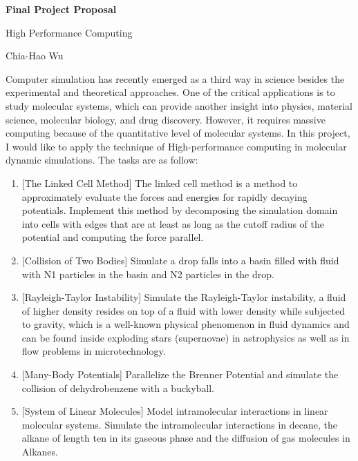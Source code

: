 \documentclass[12pt]{article} %
\newcommand{\question}[2][]{\begin{flushleft}
        \textbf{Question #1}: \textit{#2}

\end{flushleft}}
\newcommand{\maketitletwo}[2][]{\begin{center}
        \Large{\textbf{#1}
        
        High Performance Computing} %
        \vspace{5pt}
        
        \normalsize{Chia-Hao Wu  %
        
        #2}        %
        \vspace{15pt}
        
\end{center}}
\begin{document}
    \maketitletwo[Final Project Proposal]{}  %
    
    \begin{flushleft}
    Computer simulation has recently emerged as a third way in science besides the experimental and theoretical approaches. One of the critical applications is to study molecular systems, which can provide another insight into physics, material science, molecular biology, and drug discovery. However, it requires massive computing because of the quantitative level of molecular systems. In this project, I would like to apply the technique of High-performance computing in molecular dynamic simulations. The tasks are as follow:
    \begin{enumerate}[label=\emph{Task \arabic*.}]
        \item {
          [The Linked Cell Method] The linked cell method is a method to approximately evaluate the forces and energies for rapidly decaying potentials. Implement this method by decomposing the simulation domain into cells with edges that are at least as long as the cutoff radius of the potential and computing the force parallel.
          \vspace{5pt}\\
        }
        \item {[Collision of Two Bodies] Simulate a drop falls into a basin filled with fluid with N1 particles in the basin and N2 particles in the drop.\vspace{5pt}
        }
        \item {
          [Rayleigh-Taylor Instability] Simulate the Rayleigh-Taylor instability, a fluid of higher density resides on top of a fluid with lower density while subjected to gravity, which is a well-known physical phenomenon in fluid dynamics and can be found inside exploding stars (supernovae) in astrophysics as well as in flow problems in microtechnology.\vspace{5pt}\\
        }
        \item {
          [Many-Body Potentials] Parallelize the Brenner Potential and simulate the collision of dehydrobenzene with a buckyball.\vspace{5pt}\\
        }
        \item {
          [System of Linear Molecules] Model intramolecular interactions in linear molecular systems. Simulate the intramolecular interactions in decane, the alkane of length ten in its gaseous phase and the diffusion of gas molecules in Alkanes.\vspace{5pt}\\
        }
      \end{enumerate}
    \end{flushleft}
    
    
\end{document}
